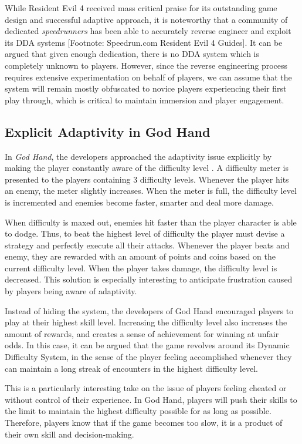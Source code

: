 \documentclass[cic,tc,english]{iiufrgs}
\begin{document}
While Resident Evil 4 received mass critical praise for its outstanding game design and successful adaptive approach, it is noteworthy that a community of dedicated \emph{speedrunners} has been able to accurately reverse engineer and exploit its DDA systems [Footnote: Speedrun.com Resident Evil 4 Guides]. It can be argued that given enough dedication, there is no DDA system which is completely unknown to players. However, since the reverse engineering process requires extensive experimentation on behalf of players, we can assume that the system will remain mostly obfuscated to novice players experiencing their first play through, which is critical to maintain immersion and player engagement.

\subsection{Explicit Adaptivity in God Hand}

In \emph{God Hand}, the developers approached the adaptivity issue explicitly by making the player constantly aware of the difficulty level \cite{article_subjectivedifficulty}. A difficulty meter is presented to the players containing 3 difficulty levels. Whenever the player hits an enemy, the meter slightly increases. When the meter is full, the difficulty level is incremented and enemies become faster, smarter and deal more damage.

When difficulty is maxed out, enemies hit faster than the player character is able to dodge. Thus, to beat the highest level of difficulty the player must devise a strategy and perfectly execute all their attacks. Whenever the player beats and enemy, they are rewarded with an amount of points and coins based on the current difficulty level. When the player takes damage, the difficulty level is decreased. This solution is especially interesting to anticipate frustration caused by players being aware of adaptivity. 

Instead of hiding the system, the developers of God Hand encouraged players to play at their highest skill level. Increasing the difficulty level also increases the amount of rewards, and creates a sense of achievement for winning at unfair odds. In this case, it can be argued that the game revolves around its Dynamic Difficulty System, in the sense of the player feeling accomplished whenever they can maintain a long streak of encounters in the highest difficulty level. 

This is a particularly interesting take on the issue of players feeling cheated or without control of their experience. In God Hand, players will push their skills to the limit to maintain the highest difficulty possible for as long as possible. Therefore, players know that if the game becomes too slow, it is a product of their own skill and decision-making.
\end{document}
